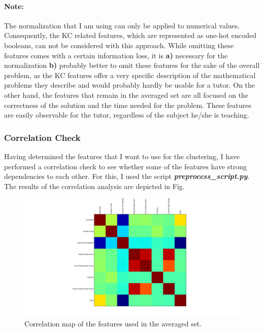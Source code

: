 \paragraph{Note: } The normalization that I am using can only be applied to numerical values. Consequently, the KC related features, which are represented as one-hot encoded booleans, can not be considered with this approach. While omitting these features comes with a certain information loss, it is \textbf{a)} necessary for the normalization \textbf{b)} probably better to omit these features for the sake of the overall problem, as the KC features offer a very specific description of the mathematical problems they describe and would probably hardly be usable for a tutor. On the other hand, the features that remain in the averaged set are all focused on the correctness of the solution and the time needed for the problem. These features are easily observable for the tutor, regardless of the subject he/she is teaching.

\subsubsection{Correlation Check}
Having determined the features that I want to use for the clustering, I have performed a correlation check to see whether some of the features have strong dependencies to each other. For this, I used the script \textbf{\emph{preprocess\_script.py}}. The results of the correlation analysis are depicted in Fig.

  \begin{figure}
  	\centering
  	\includegraphics[width=\textwidth]{./img/feature_correlation.png}
  	\caption{Correlation map of the features used in the averaged set.\label{fig_correlations}}
  \end{figure} 
  
